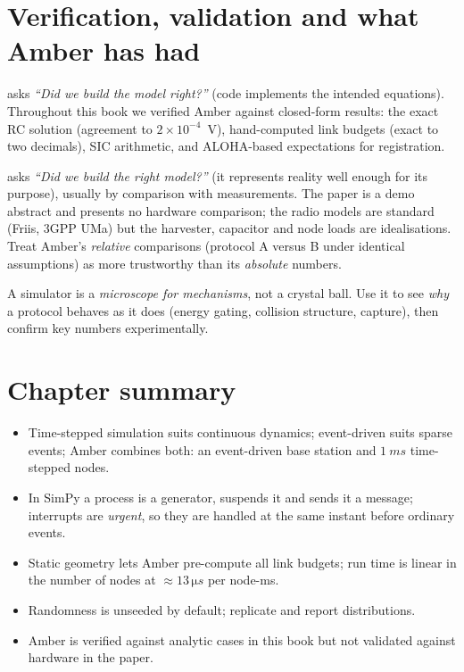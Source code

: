 \section{Verification, validation and what Amber has had}
\label{sec:vv}

\begin{description}[leftmargin=0.4cm,font=\sffamily\bfseries]
 \item[Verification] asks \emph{``Did we build the model right?''} (code implements the intended equations). Throughout this book we verified Amber against closed-form results: the exact RC solution (agreement to $2\times10^{-4}$~V),
   hand-computed link budgets (exact to two decimals), SIC arithmetic, and ALOHA-based expectations for registration.
 \item[Validation] asks \emph{``Did we build the right model?''} (it represents reality well enough for its purpose), usually by comparison with measurements. The paper is a demo abstract and presents no hardware comparison; the radio models are standard (Friis, 3GPP UMa) but
   the harvester, capacitor and node loads are idealisations. Treat Amber's \emph{relative} comparisons (protocol A versus B under identical assumptions) as more trustworthy than its \emph{absolute} numbers.
\end{description}
\begin{keyidea}
A simulator is a \emph{microscope for mechanisms}, not a crystal ball. Use it to see \emph{why} a protocol behaves as it does (energy gating, collision structure, capture), then confirm key numbers experimentally.
\end{keyidea}

\section{Chapter summary}
\begin{itemize}
 \item Time-stepped simulation suits continuous dynamics; event-driven suits sparse events; Amber combines both: an event-driven base station and $\SI{1}{ms}$ time-stepped nodes.
 \item In SimPy a process is a generator,  suspends it and  sends it a message; interrupts are \emph{urgent}, so they are handled at the same instant before ordinary events.
 \item Static geometry lets Amber pre-compute all link budgets; run time is linear in the number of nodes at $\approx13\,\si{\micro s}$ per node-ms.
 \item Randomness is unseeded by default; replicate and report distributions.
 \item Amber is verified against analytic cases in this book but not validated against hardware in the paper.
\end{itemize}

